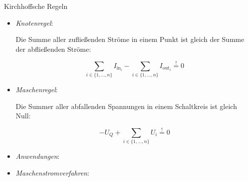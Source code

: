 \begin{defi}{Kirchhoffsche Regeln}
    \begin{itemize}
        \item \emph{Knotenregel}:

              Die Summe aller zufließenden Ströme in einem Punkt ist gleich der Summe der abfließenden Ströme:

              \[
                  \sum_{i \in \{1, \ldots, n\}} I_{\text{in}_i} - \sum_{i \in \{1, \ldots, n\}} I_{\text{out}_i} \stackrel{!}{=} 0
              \]
        \item \emph{Maschenregel}:

              Die Summer aller abfallenden Spannungen in einem Schaltkreis ist gleich Null:

              \[
                  - U_Q + \sum_{i \in \{1, \ldots, n\}} U_i \stackrel{!}{=} 0
              \]
        \item \emph{Anwendungen}:
        \item \emph{Maschenstromverfahren}:
    \end{itemize}
\end{defi}
